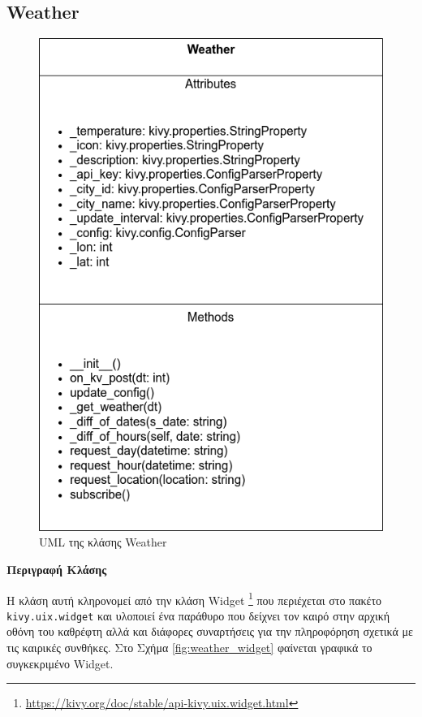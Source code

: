 \subsection{Weather}
\begin{figure}[h]
	\centering
	\includegraphics[scale=0.65]{images/chapter4/uml_diagrams/Weather.png}
	\caption{UML της κλάσης Weather}
	\label{fig:Weather}
\end{figure}
\noindent\textbf{Περιγραφή Κλάσης}

Η κλάση αυτή κληρονομεί από την κλάση Widget \footnote{\href{https://kivy.org/doc/stable/api-kivy.uix.widget.html}{https://kivy.org/doc/stable/api-kivy.uix.widget.html}} που περιέχεται στο πακέτο \texttt{kivy.uix.widget} και υλοποιεί ένα παράθυρο που δείχνει τον καιρό στην αρχική οθόνη του καθρέφτη αλλά και διάφορες συναρτήσεις για την πληροφόρηση σχετικά με τις καιρικές συνθήκες. Στο Σχήμα \ref{fig:weather_widget} φαίνεται γραφικά το συγκεκριμένο Widget.

